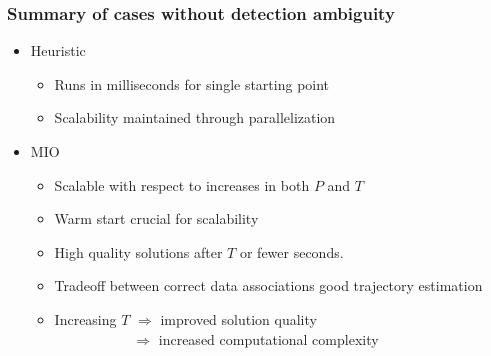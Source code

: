 \documentclass{beamer}
\begin{document}
\begin{frame}
\frametitle{Summary of cases without detection ambiguity} 
\begin{itemize}
\item Heuristic
\begin{itemize}
\item Runs in milliseconds for single starting point
\item Scalability maintained through parallelization
\end{itemize}
\item MIO
\begin{itemize}
\item Scalable with respect to increases in both $P$ and $T$
\item Warm start crucial for scalability
\item High quality solutions after $T$ or fewer seconds. 
\item Tradeoff between correct data associations good trajectory estimation
\item Increasing $T$ $\Rightarrow$ improved solution quality\\
$\qquad \qquad \quad \; \; \Rightarrow$ increased computational complexity\\
\end{itemize}
\end{itemize}
\end{frame}
\end{document}
